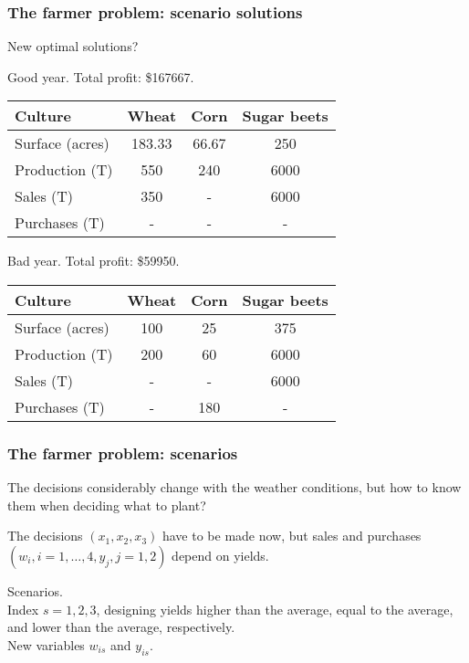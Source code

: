 \documentclass{beamer}
\def\blue{\color{blue}}
\def\red{\color{red}}
\begin{document}
\begin{frame}
\frametitle{The farmer problem: scenario solutions}

{\blue New optimal solutions?}

\mbox{}

{\red Good year}. Total profit: \$167667.
\begin{center}
\begin{tabular}{lccc}
\hline
Culture & Wheat & Corn & Sugar beets \\
\hline
Surface (acres) & 183.33 & 66.67 & 250 \\
Production (T) & 550 & 240 & 6000 \\
Sales (T) & 350 & - & 6000 \\
Purchases (T) & - & - & - \\
\hline
\end{tabular}
\end{center}

\mbox{}

\mbox{}

{\red Bad year}. Total profit: \$59950.
\begin{center}
\begin{tabular}{lccc}
\hline
Culture & Wheat & Corn & Sugar beets \\
\hline
Surface (acres) & 100 & 25 & 375 \\
Production (T) & 200 & 60 & 6000 \\
Sales (T) & - & - & 6000 \\
Purchases (T) & - & 180 & - \\
\hline
\end{tabular}
\end{center}

\end{frame}

\begin{frame}
\frametitle{The farmer problem: scenarios}

The decisions considerably change with the weather conditions, but how to know them when deciding what to plant?
\mbox{}

The decisions $(x_1, x_2, x_3)$ have to be made now, but sales and purchases $(w_i, i=1,\ldots,4, y_j, j=1,2)$ depend on yields.

\mbox{}

{\blue Scenarios}.\\
Index $s = 1, 2, 3$, designing yields higher than the average, equal to the average, and lower than the average, respectively.\\
New variables $w_{is}$ and $y_{is}$.

\end{frame}
\end{document}
